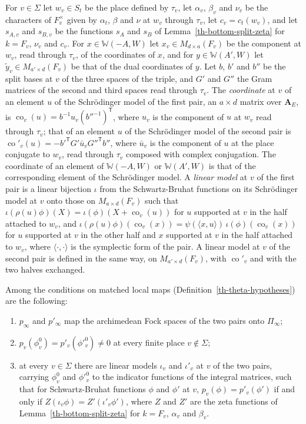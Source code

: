 \begin{situation}
For $v\in\Sigma$ let $w_v\in S_t$ be the place defined by $\tau_v$, let
$\alpha_v$, $\beta_v$ and $\nu_v$ be the characters of $F_v^\times$ given by
$\alpha_t$, $\beta$ and $\nu$ at $w_v$ through $\tau_v$, let $c_v=c_t(w_v)$,
and let $s_{A,v}$ and $s_{B,v}$ be the functions $s_A$ and $s_B$ of
Lemma~\ref{th-bottom-split-zeta} for $k=F_v$, $\nu_v$ and $c_v$. For
$x\in\mathbb W(-A,W)$ let $x_v\in M_{d\times a}(F_v)$ be the component at
$w_v$, read through $\tau_v$, of the coordinates of $x$, and for
$y\in\mathbb W(A',W)$ let $\tilde y_v\in M_{a'\times d}(F_v)$ be that of the
dual coordinates of $y$. Let $b$, $b'$ and $b''$ be the split bases at $v$ of
the three spaces of the triple, and $G'$ and $G''$ the Gram matrices of the
second and third spaces read through $\tau_v$. The \emph{coordinate} at $v$ of
an element $u$ of the Schrödinger model of the first pair, an $a\times d$
matrix over $\mathbf A_E$, is $\operatorname{co}_v(u)=b^{-1}u_v(b''^{-1})^{\mathsf T}$,
where $u_v$ is the component of $u$ at $w_v$ read through $\tau_v$; that of an
element $u$ of the Schrödinger model of the second pair is
$\operatorname{co}'_v(u)=-b'^{\mathsf T}G'\bar u_v{G''}^{\mathsf T}b''$, where
$\bar u_v$ is the component of $u$ at the place conjugate to $w_v$, read
through $\tau_v$ composed with complex conjugation. The
coordinate of an element of $\mathbb W(-A,W)$ or $\mathbb W(A',W)$ is that of
the corresponding element of the Schrödinger model. A \emph{linear model} at
$v$ of the first pair is a linear bijection $\iota$ from the Schwartz-Bruhat
functions on its Schrödinger model at $v$ onto those on $M_{a\times d}(F_v)$
such that $\iota(\rho(u)\phi)(X)=\iota(\phi)(X+\operatorname{co}_v(u))$ for $u$
supported at $v$ in the half attached to $w_v$, and
$\iota(\rho(u)\phi)(\operatorname{co}_v(x))=\psi(\langle x,u\rangle)\,\iota(\phi)(\operatorname{co}_v(x))$
for $u$ supported at $v$ in the other half and $x$ supported at $v$ in the half
attached to $w_v$, where $\langle\cdot,\cdot\rangle$ is the symplectic form of
the pair. A linear model at $v$ of the second pair is defined in the same way,
on $M_{a'\times d}(F_v)$, with $\operatorname{co}'_v$ and with the two halves
exchanged.

Among the conditions on matched local maps (Definition~\ref{th-theta-hypotheses})
are the following:
\begin{enumerate}
\item[(M1)] $p_\infty$ and $p'_\infty$ map the archimedean Fock spaces of the two
  pairs onto $\Pi_\infty$;
\item[(M2)] $p_v(\phi^0_v)=p'_v(\phi'^0_v)\neq0$ at every finite place
  $v\notin\Sigma$;
\item[(M3)] at every $v\in\Sigma$ there are linear models $\iota_v$ and
  $\iota'_v$ at $v$ of the two pairs, carrying $\phi^0_v$ and $\phi'^0_v$ to
  the indicator functions of the integral matrices, such that for
  Schwartz-Bruhat functions $\phi$ and $\phi'$ at $v$,
  $p_v(\phi)=p'_v(\phi')$ if and only if $Z(\iota_v\phi)=Z'(\iota'_v\phi')$,
  where $Z$ and $Z'$ are the zeta functions of
  Lemma~\ref{th-bottom-split-zeta} for $k=F_v$, $\alpha_v$ and $\beta_v$.
\end{enumerate}
\end{situation}
